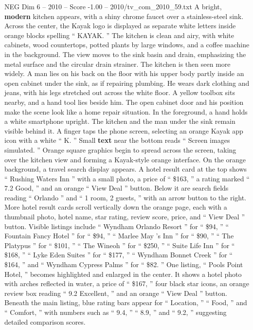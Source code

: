 \begin{textsample}{NEG Dim 6 – 2010 – Score -1.00 – 2010/tv\_com\_2010\_59.txt}  \label{ex:f6_neg_011}
A bright, \textbf{modern} kitchen appears, with a shiny chrome faucet over a stainless-steel sink.
Across the center, the Kayak logo is displayed as separate white letters inside orange blocks spelling “ KAYAK. ” The kitchen is clean and airy, with white cabinets, wood countertops, potted plants by large windows, and a coffee machine in the background.
The view moves to the sink basin and drain, emphasizing the metal surface and the circular drain strainer.
The kitchen is then seen more widely.
A man lies on his back on the floor with his upper body partly inside an open cabinet under the sink, as if repairing plumbing.
He wears dark clothing and jeans, with his legs stretched out across the white floor.
A yellow toolbox sits nearby, and a hand tool lies beside him.
The open cabinet door and his position make the scene look like a home repair situation.
In the foreground, a hand holds a white smartphone upright.
The kitchen and the man under the sink remain visible behind it.
A finger taps the phone screen, selecting an orange Kayak app icon with a white “ K. ” Small \textbf{text} near the bottom reads “ Screen images simulated. ” Orange square graphics begin to spread across the screen, taking over the kitchen view and forming a Kayak-style orange interface.
On the orange background, a travel search display appears.
A hotel result card at the top shows “ Rushing Waters Inn ” with a small photo, a price of “ \$163, ” a rating marked “ 7.2 Good, ” and an orange “ View Deal ” button.
Below it are search fields reading “ Orlando ” and “ 1 room, 2 guests, ” with an arrow button to the right.
More hotel result cards scroll vertically down the orange page, each with a thumbnail photo, hotel name, star rating, review score, price, and “ View Deal ” button.
Visible listings include “ Wyndham Orlando Resort ” for “ \$94, ” “ Fountain Fancy Hotel ” for “ \$94, ” “ Marlee May ’s Inn ” for “ \$90, ” “ The Platypus ” for “ \$101, ” “ The Wineoh ” for “ \$250, ” “ Suite Life Inn ” for “ \$168, ” “ Lyke Eden Suites ” for “ \$177, ” “ Wyndham Bonnet Creek ” for “ \$164, ” and “ Wyndham Cypress Palms ” for “ \$82. ” One listing, “ Pools Point Hotel, ” becomes highlighted and enlarged in the center.
It shows a hotel photo with arches reflected in water, a price of “ \$167, ” four black star icons, an orange review box reading “ 9.2 Excellent, ” and an orange “ View Deal ” button.
Beneath the main listing, blue rating bars appear for “ Location, ” “ Food, ” and “ Comfort, ” with numbers such as “ 9.4, ” “ 8.9, ” and “ 9.2, ” suggesting detailed comparison scores.

\end{textsample}
